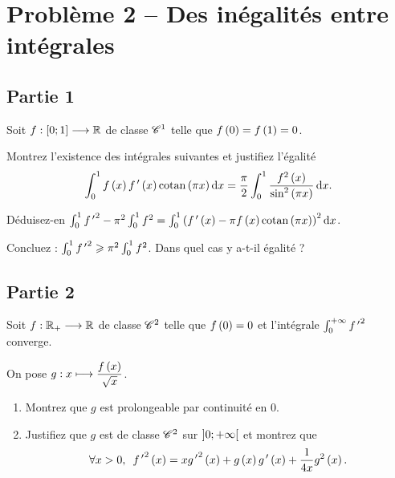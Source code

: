 \section*{Problème 2 -- Des inégalités entre intégrales}

\subsection*{Partie 1}

Soit \(f:\left[0;1\right]\longrightarrow\mathbb{R}\) de classe \(\mathscr{C}^{1}\) telle que \(f\left(0\right)=f\left(1\right)=0\).

\setcounter{q}{0}
\begin{q}
Montrez l'existence des intégrales suivantes et justifiez l'égalité \[\int_0^1f\paren{x}f\prim\paren{x}\cotan\paren{\pi x}\odif{x}=\dfrac{\pi}{2}\int_0^1\dfrac{f^2\paren{x}}{\sin^2\paren{\pi x}}\odif{x}.\]
\end{q}

\begin{q}
Déduisez-en \(\int_0^1{f\prim}^2-\pi^2\int_0^1f^2=\int_0^1\paren{f\prim\paren{x}-\pi f\paren{x}\cotan\paren{\pi x}}^2\odif{x}\).
\end{q}

\begin{q}
Concluez : \(\int_0^1{f^{\,\prime}}^2\geqslant\pi^2\int_0^1f^2\). Dans quel cas y a-t-il égalité ?
\end{q}

\subsection*{Partie 2}

Soit \(f:\mathbb{R}_+\longrightarrow\mathbb{R}\) de classe \(\mathscr{C}^{2}\) telle que \(f\left(0\right)=0\) et l'intégrale \(\int_0^{+\infty}{f^{\,\prime}}^2\) converge.

On pose \(g:x\longmapsto\dfrac{f\left(x\right)}{\sqrt{x}}\).

\begin{q}
\begin{enumerate}
    \item Montrez que \(g\) est prolongeable par continuité en \(0\). \\
    \item Justifiez que \(g\) est de classe \(\mathscr{C}^{2}\) sur \(\left]0;+\infty\right[\) et montrez que \[\quantifs{\forall x>0}{f\prim}^2\paren{x}=x{g\prim}^2\paren{x}+g\paren{x}g\prim\paren{x}+\dfrac{1}{4x}g^2\paren{x}.\]
\end{enumerate}
\end{q}

